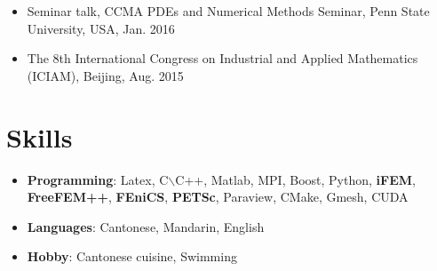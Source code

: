 \documentclass[letterpaper]{article}
\begin{document}
\begin{itemize}[leftmargin=*]
\item Seminar talk, CCMA PDEs and Numerical Methods Seminar, Penn State University, USA, Jan. 2016
\item The 8th International Congress on Industrial and Applied Mathematics (ICIAM), Beijing, Aug. 2015
\end{itemize}

\section*{Skills}
\begin{itemize}[leftmargin=*]
\item \textbf{Programming}: Latex, C$\backslash$C++, Matlab, MPI, Boost, Python, \textbf{iFEM}, \textbf{FreeFEM++}, \textbf{FEniCS}, \textbf{PETSc}, Paraview, CMake, Gmesh, CUDA
\item\textbf{Languages}: Cantonese, Mandarin, English

\item \textbf{Hobby}: Cantonese cuisine, Swimming 
\end{itemize}
\end{document}
